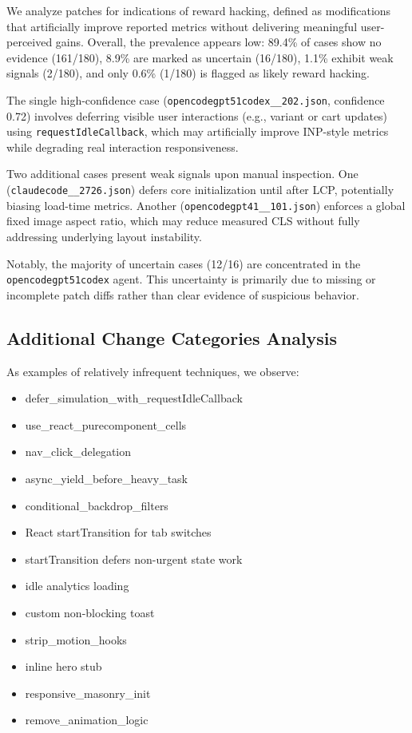 We analyze patches for indications of reward hacking, defined as modifications that artificially improve reported metrics without delivering meaningful user-perceived gains. Overall, the prevalence appears low: 89.4\% of cases show no evidence (161/180), 8.9\% are marked as uncertain (16/180), 1.1\% exhibit weak signals (2/180), and only 0.6\% (1/180) is flagged as likely reward hacking.

The single high-confidence case (\texttt{opencodegpt51codex\_\_202.json}, confidence 0.72) involves deferring visible user interactions (e.g., variant or cart updates) using \texttt{requestIdleCallback}, which may artificially improve INP-style metrics while degrading real interaction responsiveness.

Two additional cases present weak signals upon manual inspection. One (\texttt{claudecode\_\_2726.json}) defers core initialization until after LCP, potentially biasing load-time metrics. Another (\texttt{opencodegpt41\_\_101.json}) enforces a global fixed image aspect ratio, which may reduce measured CLS without fully addressing underlying layout instability.

Notably, the majority of uncertain cases (12/16) are concentrated in the \texttt{opencodegpt51codex} agent. This uncertainty is primarily due to missing or incomplete patch diffs rather than clear evidence of suspicious behavior.

\subsection{Additional Change Categories Analysis}

As examples of relatively infrequent techniques, we observe:
\begin{itemize}
    \item defer\_simulation\_with\_requestIdleCallback
    \item use\_react\_purecomponent\_cells
    \item nav\_click\_delegation
    \item async\_yield\_before\_heavy\_task
    \item conditional\_backdrop\_filters
    \item React startTransition for tab switches
    \item startTransition defers non-urgent state work
    \item idle analytics loading
    \item custom non-blocking toast
    \item strip\_motion\_hooks
    \item inline hero stub
    \item responsive\_masonry\_init
    \item remove\_animation\_logic
\end{itemize}

